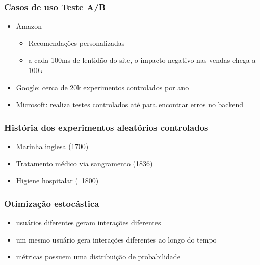 \documentclass[xcolor=dvipsnames]{beamer}
\begin{document}
\begin{frame}%
\frametitle{Casos de uso Teste A/B}

\begin{itemize}
\item Amazon
\begin{itemize}
\item Recomendações personalizadas
\item a cada 100ms de lentidão do site, o impacto negativo nas vendas chega a 100k
\end{itemize}

\item Google: cerca de 20k experimentos controlados por ano

\item Microsoft: realiza testes controlados até para encontrar erros no backend

\end{itemize}

\end{frame}%


\begin{frame}%
\frametitle{História dos experimentos aleatórios controlados}

\begin{itemize}
\item Marinha inglesa (1700)
\item Tratamento médico via sangramento (1836)
\item Higiene hospitalar (~1800)
\end{itemize}

\end{frame}%



\begin{frame}%
\frametitle{Otimização estocástica}

\begin{itemize}
\item usuários diferentes geram interações diferentes
\item um mesmo usuário gera interações diferentes ao longo do tempo
\item métricas possuem uma distribuição de probabilidade
\end{itemize}

\end{frame}%
\end{document}
